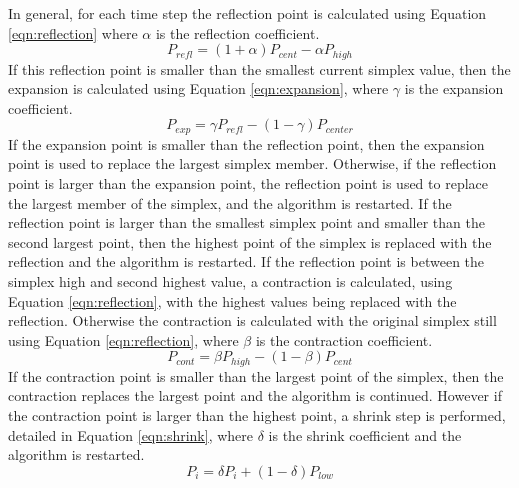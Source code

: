 In general, for each time step the reflection point is calculated using Equation \ref{eqn:reflection} where $\alpha$ is the reflection coefficient.
	\begin{equation}\label{eqn:reflection}
		P_{refl} = (1 + \alpha) P_{cent} - \alpha P_{high}
	\end{equation}
If this reflection point is smaller than the smallest current simplex value, then the expansion is calculated using Equation \ref{eqn:expansion}, where $\gamma$ is the expansion coefficient.
	\begin{equation}\label{eqn:expansion}
		P_{exp} = \gamma P_{refl} - (1 - \gamma) P_{center}
	\end{equation}
If the expansion point is smaller than the reflection point, then the expansion point is used to replace the largest simplex member.  Otherwise, if the reflection point is larger than the expansion point, the reflection point is used to replace the largest member of the simplex, and the algorithm is restarted.
If the reflection point is larger than the smallest simplex point and smaller than the second largest point, then the highest point of the simplex is replaced with the reflection and the algorithm is restarted. 
If the reflection point is between the simplex high and second highest value, a contraction is calculated, using Equation \ref{eqn:reflection}, with the highest values being replaced with the reflection.  Otherwise the contraction is calculated with the original simplex still using Equation \ref{eqn:reflection}, where $\beta$ is the contraction coefficient.
	\begin{equation}\label{eqn:contraction}
		P_{cont} = \beta P_{high} - (1 - \beta) P_{cent}	
	\end{equation}
If the contraction point is smaller than the largest point of the simplex, then the contraction replaces the largest point and the algorithm is continued.
However if the contraction point is larger than the highest point, a shrink step is performed, detailed in Equation \ref{eqn:shrink}, where $\delta$ is the shrink coefficient and the algorithm is restarted.
	\begin{equation}\label{eqn:shrink}
		P_{i} = \delta P_{i} + (1 - \delta) P_{low}
	\end{equation}